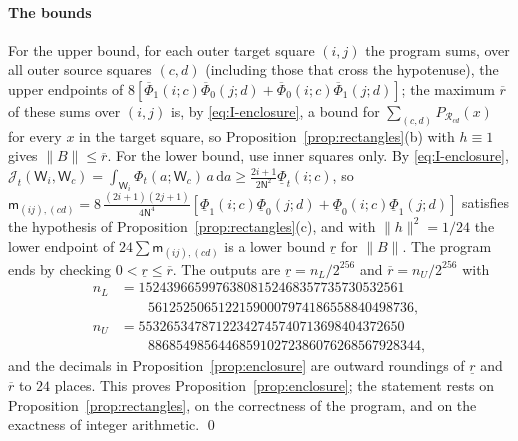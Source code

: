 \documentclass[preprint,12pt,a4paper]{elsarticle}
\theoremstyle{remark}
\newcommand{\dd}{\,\mathrm d}
\begin{document}
\paragraph{The bounds}
For the upper bound, for each outer target square $(i,j)$ the program sums, over all outer source
squares $(c,d)$ (including those that cross the hypotenuse), the upper endpoints of
$8[\overline \Phi_1(i;c)\overline \Phi_0(j;d)+\overline \Phi_0(i;c)\overline \Phi_1(j;d)]$;
the maximum $\overline r$ of these sums over $(i,j)$ is, by \eqref{eq:I-enclosure}, a bound for
$\sum_{(c,d)}P_{\mathcal R_{cd}}(x)$ for every $x$ in the target square, so
Proposition~\ref{prop:rectangles}(b) with $h\equiv1$ gives $\|B\|\le\overline r$.
For the lower bound, use inner squares only. By \eqref{eq:I-enclosure},
$\mathcal J_t(\mathsf W_i,\mathsf W_c)=\int_{\mathsf W_i}\Phi_t(a;\mathsf W_c)\,a\dd a\ge\frac{2i+1}{2\mathsf N^2}\underline \Phi_t(i;c)$, so
$\mathsf m_{(ij),(cd)}=8\,\frac{(2i+1)(2j+1)}{4\mathsf N^4}
[\underline \Phi_1(i;c)\underline \Phi_0(j;d)+\underline \Phi_0(i;c)\underline \Phi_1(j;d)]$ satisfies the hypothesis of
Proposition~\ref{prop:rectangles}(c), and with $\|h\|^2=1/24$ the lower endpoint of
$24\sum\mathsf m_{(ij),(cd)}$ is a lower bound $\underline r$ for $\|B\|$. The program ends by
checking $0<\underline r\le\overline r$. The outputs are
$\underline r=n_L/2^{256}$ and $\overline r=n_U/2^{256}$ with
\begin{align*}
 n_L&=15243966599763808152468357735730532561\\&\qquad56125250651221590007974186558840498736,\\
 n_U&=55326534787122342745740713698404372650\\&\qquad886854985644685910272386076268567928344 ,
\end{align*}
and the decimals in Proposition~\ref{prop:enclosure} are outward
roundings of $\underline r$ and $\overline r$ to $24$ places. This proves Proposition~\ref{prop:enclosure}; the
statement rests on Proposition~\ref{prop:rectangles}, on the correctness of the program, and on
the exactness of integer arithmetic. \qed



\end{document}

